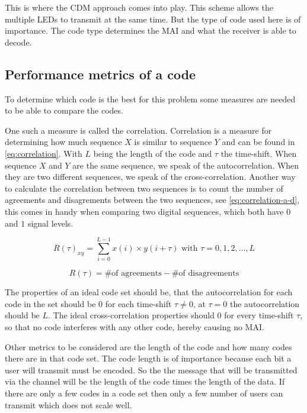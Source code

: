 	This is where the CDM approach comes into play.
	This scheme allows the multiple LEDs to transmit at the same time.
	But the type of code used here is of importance.
	The code type determines the MAI and what the receiver is able to decode.

	\subsection{Performance metrics of a code}
	\label{subsec:performance-metrics}

		To determine which code is the best for this problem some measures are needed to be able to compare the codes.

		One such a measure is called the correlation.
		Correlation is a measure for determining how much sequence $X$ is similar to sequence $Y$ and can be found in \autoref{eq:correlation}.
		With $L$ being the length of the code and $\tau$ the time-shift.
		When sequence $X$ and $Y$ are the same sequence, we speak of the autocorrelation.
		When they are two different sequences, we speak of the cross-correlation. 
		Another way to calculate the correlation between two sequences is to count the number of agreements and disagrements between the two sequences, see \autoref{eq:correlation-a-d}, this comes in handy when comparing two digital sequences, which both have $0$ and $1$ signal levels.

		\begin{equation}
			R(\tau)_{xy} = \displaystyle\sum_{i = 0} ^ {L - 1} x(i) \times y(i + \tau) {\text{  with $\tau = 0, 1, 2, \dotsc, L$}}
			\label{eq:correlation}
		\end{equation}

		\begin{equation}
			R(\tau) = \text{\# of agreements} - \text{\# of disagreements} 
			\label{eq:correlation-a-d}
		\end{equation}

		The properties of an ideal code set should be, that the autocorrelation for each code in the set should be $0$ for each time-shift $\tau \neq 0$, at $\tau = 0$ the autocorrelation should be $L$.
		The ideal cross-correlation properties should $0$ for every time-shift $\tau$, so that no code interferes with any other code, hereby causing no MAI.

		Other metrics to be considered are the length of the code and how many codes there are in that code set.
		The code length is of importance because each bit a user will transmit must be encoded. 
		So the the message that will be transmitted via the channel will be the length of the code times the length of the data.
		If there are only a few codes in a code set then only a few number of users can transmit which does not scale well. 

